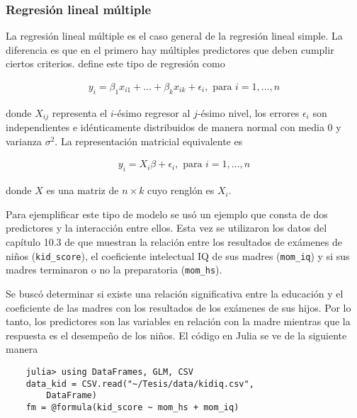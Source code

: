 \subsubsection{Regresión lineal múltiple}
La regresión lineal múltiple es el caso general de la regresión lineal simple. La diferencia es que en el primero hay múltiples predictores que deben cumplir ciertos criterios. \cite{regression_other_stories} define este tipo de regresión como 

\begin{equation*}
    \begin{aligned}
    y_i = \beta_1 x_{i1} + \dots + \beta_k x_{ik} + \epsilon_i, \text{ para } i = 1, \dots, n
    \end{aligned}
\end{equation*}

\noindent donde $X_{ij}$ representa el $i$-ésimo regresor al $j$-ésimo nivel, los errores $\epsilon_i$ son independientes e idénticamente distribuidos de manera normal con media 0 y varianza $\sigma^2$. La representación matricial equivalente es 

\begin{equation} \label{eq_rlm}
    \begin{aligned}
        y_i = X_i \beta + \epsilon_i, \text{ para } i = 1, \dots, n
    \end{aligned}
\end{equation}

\noindent donde $X$ es una matriz de $n \times k$ cuyo renglón es $X_i$.

Para ejemplificar este tipo de modelo se usó un ejemplo que consta de dos predictores y la interacción entre ellos. Esta vez se utilizaron los datos del capítulo 10.3 de \cite{regression_other_stories} que muestran la relación entre los resultados de exámenes de niños (\texttt{kid\_score}), el coeficiente intelectual IQ de sus madres (\texttt{mom\_iq}) y si sus madres terminaron o no la preparatoria (\texttt{mom\_hs}). 

Se buscó determinar si existe una relación significativa entre la educación y el coeficiente de las madres con los resultados de los exámenes de sus hijos. Por lo tanto, los predictores son las variables en relación con la madre mientras que la respuesta es el desempeño de los niños. El código en \textsf{Julia} se ve de la siguiente manera

\begin{verbatim}
    julia> using DataFrames, GLM, CSV
    data_kid = CSV.read("~/Tesis/data/kidiq.csv", 
    	DataFrame)
    fm = @formula(kid_score ~ mom_hs + mom_iq)
\end{verbatim}

